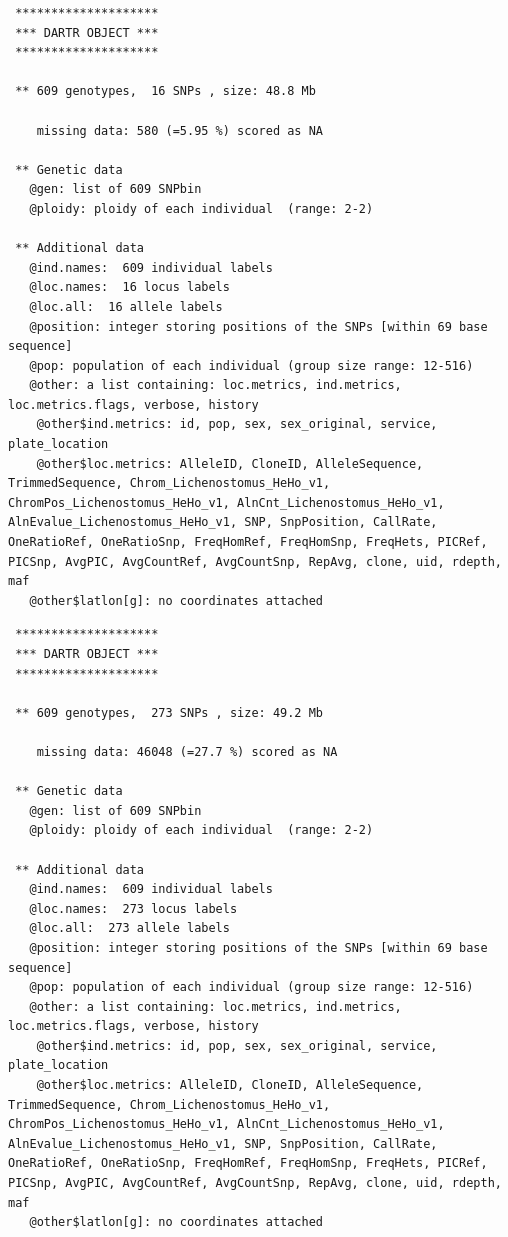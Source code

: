 \documentclass[
  letterpaper,
  DIV=11,
  numbers=noendperiod]{scrreprt}
\newenvironment{Shaded}{\begin{snugshade}}{\end{snugshade}}
\newcommand{\NormalTok}[1]{\textcolor[rgb]{0.00,0.44,0.13}{#1}}
\newcommand{\SpecialCharTok}[1]{\textcolor[rgb]{0.25,0.44,0.63}{#1}}
\begin{document}
\begin{verbatim}
 ********************
 *** DARTR OBJECT ***
 ********************

 ** 609 genotypes,  16 SNPs , size: 48.8 Mb

    missing data: 580 (=5.95 %) scored as NA

 ** Genetic data
   @gen: list of 609 SNPbin
   @ploidy: ploidy of each individual  (range: 2-2)

 ** Additional data
   @ind.names:  609 individual labels
   @loc.names:  16 locus labels
   @loc.all:  16 allele labels
   @position: integer storing positions of the SNPs [within 69 base sequence]
   @pop: population of each individual (group size range: 12-516)
   @other: a list containing: loc.metrics, ind.metrics, loc.metrics.flags, verbose, history 
    @other$ind.metrics: id, pop, sex, sex_original, service, plate_location 
    @other$loc.metrics: AlleleID, CloneID, AlleleSequence, TrimmedSequence, Chrom_Lichenostomus_HeHo_v1, ChromPos_Lichenostomus_HeHo_v1, AlnCnt_Lichenostomus_HeHo_v1, AlnEvalue_Lichenostomus_HeHo_v1, SNP, SnpPosition, CallRate, OneRatioRef, OneRatioSnp, FreqHomRef, FreqHomSnp, FreqHets, PICRef, PICSnp, AvgPIC, AvgCountRef, AvgCountSnp, RepAvg, clone, uid, rdepth, maf 
   @other$latlon[g]: no coordinates attached
\end{verbatim}

\begin{Shaded}
\end{Shaded}

\begin{verbatim}
 ********************
 *** DARTR OBJECT ***
 ********************

 ** 609 genotypes,  273 SNPs , size: 49.2 Mb

    missing data: 46048 (=27.7 %) scored as NA

 ** Genetic data
   @gen: list of 609 SNPbin
   @ploidy: ploidy of each individual  (range: 2-2)

 ** Additional data
   @ind.names:  609 individual labels
   @loc.names:  273 locus labels
   @loc.all:  273 allele labels
   @position: integer storing positions of the SNPs [within 69 base sequence]
   @pop: population of each individual (group size range: 12-516)
   @other: a list containing: loc.metrics, ind.metrics, loc.metrics.flags, verbose, history 
    @other$ind.metrics: id, pop, sex, sex_original, service, plate_location 
    @other$loc.metrics: AlleleID, CloneID, AlleleSequence, TrimmedSequence, Chrom_Lichenostomus_HeHo_v1, ChromPos_Lichenostomus_HeHo_v1, AlnCnt_Lichenostomus_HeHo_v1, AlnEvalue_Lichenostomus_HeHo_v1, SNP, SnpPosition, CallRate, OneRatioRef, OneRatioSnp, FreqHomRef, FreqHomSnp, FreqHets, PICRef, PICSnp, AvgPIC, AvgCountRef, AvgCountSnp, RepAvg, clone, uid, rdepth, maf 
   @other$latlon[g]: no coordinates attached
\end{verbatim}
\end{document}
